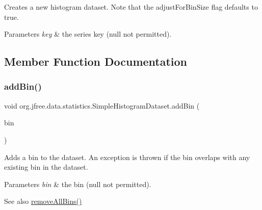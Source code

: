 Creates a new histogram dataset. Note that the {\ttfamily adjust\+For\+Bin\+Size} flag defaults to {\ttfamily true}.


\begin{DoxyParams}{Parameters}
{\em key} & the series key ({\ttfamily null} not permitted). \\
\hline
\end{DoxyParams}


\subsection{Member Function Documentation}
\mbox{\label{classorg_1_1jfree_1_1data_1_1statistics_1_1_simple_histogram_dataset_ab06acc1a7e2ca892026bfa3f0228e407}} 
\subsubsection{\texorpdfstring{add\+Bin()}{addBin()}}
{\footnotesize\ttfamily void org.\+jfree.\+data.\+statistics.\+Simple\+Histogram\+Dataset.\+add\+Bin (\begin{DoxyParamCaption}\item[{\mbox{\hyperlink{classorg_1_1jfree_1_1data_1_1statistics_1_1_simple_histogram_bin}{Simple\+Histogram\+Bin}}}]{bin }\end{DoxyParamCaption})}

Adds a bin to the dataset. An exception is thrown if the bin overlaps with any existing bin in the dataset.


\begin{DoxyParams}{Parameters}
{\em bin} & the bin ({\ttfamily null} not permitted).\\
\hline
\end{DoxyParams}
\begin{DoxySeeAlso}{See also}
\mbox{\hyperlink{classorg_1_1jfree_1_1data_1_1statistics_1_1_simple_histogram_dataset_a887a7d02aa9f339c8031c64a36f525bc}{remove\+All\+Bins()}} 
\end{DoxySeeAlso}
\mbox{\label{classorg_1_1jfree_1_1data_1_1statistics_1_1_simple_histogram_dataset_a8a79398240a231d6b15ef632a4e74ff7}} 
